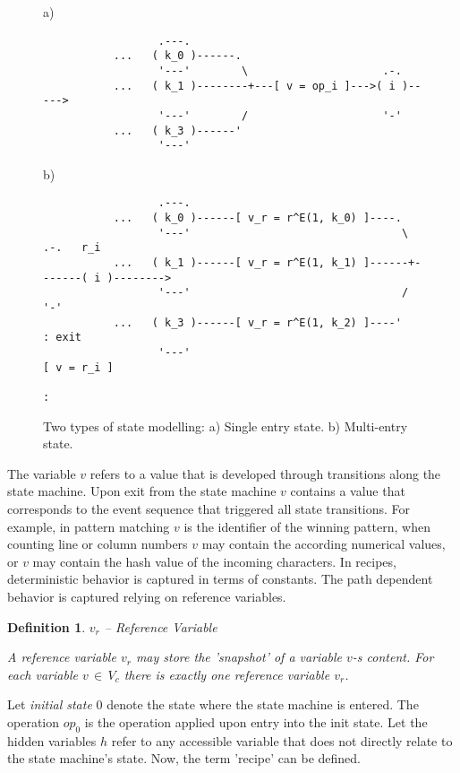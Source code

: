 \documentclass[12pt,a4paper]{scrartcl}
\newtheorem{definition}{Definition}
\begin{document}
\begin{figure}[htbp] \leavevmode \label{fig:se-vs-me}
a)

\begin{verbatim}
                  .---.  
           ...   ( k_0 )------.
                  '---'        \                     .-.
           ...   ( k_1 )--------+---[ v = op_i ]--->( i )----->   
                  '---'        /                     '-'
           ...   ( k_3 )------'       
                  '---'
\end{verbatim}
     
b)
     
\begin{verbatim}
                  .---.
           ...   ( k_0 )------[ v_r = r^E(1, k_0) ]----.
                  '---'                                 \         .-.   r_i
           ...   ( k_1 )------[ v_r = r^E(1, k_1) ]------+-------( i )-------->  
                  '---'                                 /         '-'
           ...   ( k_3 )------[ v_r = r^E(1, k_2) ]----'           : exit
                  '---'                                       [ v = r_i ]
                                                                   :
\end{verbatim}
\caption{Two types of state modelling: a) Single entry state. 
b) Multi-entry state.}
\end{figure}

The variable $v$ refers to a value that is developed through transitions along
the state machine. Upon exit from the state machine $v$ contains a value that
corresponds to the event sequence that triggered all state transitions. For
example, in pattern matching $v$ is the identifier of the winning pattern, when
counting line or column numbers $v$ may contain the according numerical values,
or $v$ may contain the hash value of the incoming characters. In recipes,
deterministic behavior is captured in terms of constants. The path dependent
behavior is captured relying on reference variables.

\begin{definition} $v_r$ -- Reference Variable

    A reference variable $v_r$ may store the 'snapshot' of a variable $v$-s
    content. For each variable $v\,\in\,V_c$ there is exactly one reference
    variable $v_r$.

\end{definition}

Let \textit{initial state} 0 denote the state where the state machine is entered.
The operation $op_0$ is the operation applied upon entry into the init state.
Let the hidden variables $h$ refer to any accessible variable that does not
directly relate to the state machine's state. Now, the term 'recipe' can 
be defined.
\end{document}
